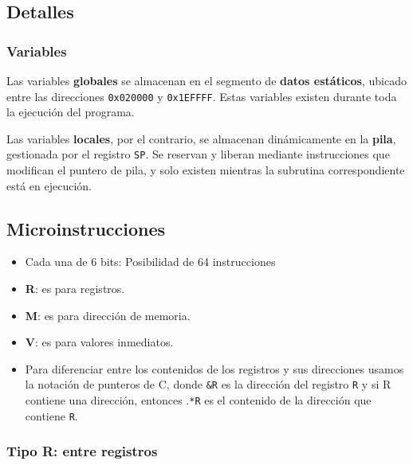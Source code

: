 \documentclass{article}
\begin{document}
\subsection{Detalles}

\subsubsection{Variables}

Las variables \textbf{globales} se almacenan en el segmento de
\textbf{datos estáticos}, ubicado entre las direcciones
\texttt{0x020000} y \texttt{0x1EFFFF}. Estas variables
existen durante toda la ejecución del programa.

Las variables \textbf{locales}, por el contrario, se
almacenan dinámicamente en la \textbf{pila}, gestionada por
el registro \texttt{SP}. Se reservan y liberan mediante
instrucciones que modifican el puntero de pila,
y solo existen mientras la subrutina
correspondiente está en ejecución.

\subsection{Microinstrucciones}

\begin{itemize}
  \item Cada una de 6 bits: Posibilidad de 64 instrucciones
  \item \textbf{R}: es para registros.
  \item \textbf{M}: es para dirección de memoria.
  \item \textbf{V}: es para valores inmediatos.
  \item Para diferenciar entre los contenidos de los registros y sus direcciones usamos la notación de punteros de C, donde \texttt{\&R} es la dirección del registro \texttt{R} y si R contiene una dirección, entonces .\texttt{*R} es el contenido de la dirección que contiene \texttt{R}.
\end{itemize}

\subsubsection{Tipo R: \textbf{entre registros}}
\end{document}
